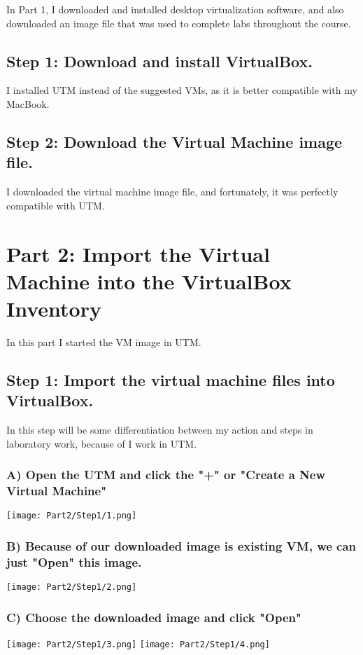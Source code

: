 \documentclass{article}
\begin{document}
In Part 1, I downloaded and installed desktop virtualization software, and also downloaded an image file that
was used to complete labs throughout the course.

\subsection*{Step 1: Download and install VirtualBox.}
I installed UTM instead of the suggested VMs, as it is better compatible with my MacBook.

\subsection*{Step 2: Download the Virtual Machine image file.}
I downloaded the virtual machine image file, and fortunately, it was perfectly compatible with UTM.

\section*{Part 2: Import the Virtual Machine into the VirtualBox Inventory}

In this part I started the VM image in UTM.

\subsection*{Step 1: Import the virtual machine files into VirtualBox.}

In this step will be some differentiation between my action and steps in laboratory work, because of I work in UTM.

\subsubsection*{A) Open the UTM and click the "+" or "Create a New Virtual Machine"}
\texttt{[image: Part2/Step1/1.png]}

\subsubsection*{B) Because of our downloaded image is existing VM, we can just "Open" this image. }
\texttt{[image: Part2/Step1/2.png]}

\subsubsection*{C) Choose the downloaded image and click "Open" }
\texttt{[image: Part2/Step1/3.png]}
\texttt{[image: Part2/Step1/4.png]}
\end{document}
